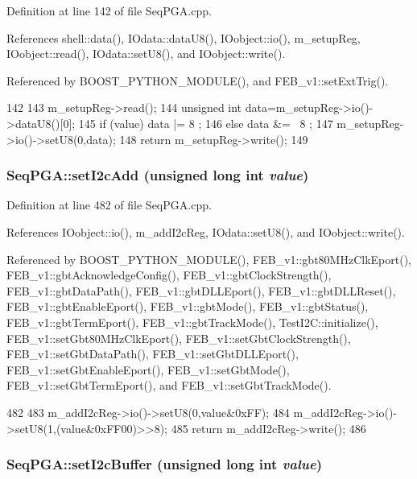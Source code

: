 Definition at line 142 of file SeqPGA.cpp.

References shell::data(), IOdata::dataU8(), IOobject::io(), m\_\-setupReg, IOobject::read(), IOdata::setU8(), and IOobject::write().

Referenced by BOOST\_\-PYTHON\_\-MODULE(), and FEB\_\-v1::setExtTrig().


\begin{DoxyCode}
142                                          {
143   m_setupReg->read();
144   unsigned int data=m_setupReg->io()->dataU8()[0];
145   if (value) data |=  8 ;
146   else       data &= ~8 ;
147   m_setupReg->io()->setU8(0,data);
148   return m_setupReg->write();
149 }
\end{DoxyCode}
\hypertarget{classSeqPGA_a4ef334e4d2cb417b49033dce951728cd}{
\subsubsection[{setI2cAdd}]{ SeqPGA::setI2cAdd (unsigned long int {\em value})}}
\label{classSeqPGA_a4ef334e4d2cb417b49033dce951728cd}


Definition at line 482 of file SeqPGA.cpp.

References IOobject::io(), m\_\-addI2cReg, IOdata::setU8(), and IOobject::write().

Referenced by BOOST\_\-PYTHON\_\-MODULE(), FEB\_\-v1::gbt80MHzClkEport(), FEB\_\-v1::gbtAcknowledgeConfig(), FEB\_\-v1::gbtClockStrength(), FEB\_\-v1::gbtDataPath(), FEB\_\-v1::gbtDLLEport(), FEB\_\-v1::gbtDLLReset(), FEB\_\-v1::gbtEnableEport(), FEB\_\-v1::gbtMode(), FEB\_\-v1::gbtStatus(), FEB\_\-v1::gbtTermEport(), FEB\_\-v1::gbtTrackMode(), TestI2C::initialize(), FEB\_\-v1::setGbt80MHzClkEport(), FEB\_\-v1::setGbtClockStrength(), FEB\_\-v1::setGbtDataPath(), FEB\_\-v1::setGbtDLLEport(), FEB\_\-v1::setGbtEnableEport(), FEB\_\-v1::setGbtMode(), FEB\_\-v1::setGbtTermEport(), and FEB\_\-v1::setGbtTrackMode().


\begin{DoxyCode}
482                                                      {
483   m_addI2cReg->io()->setU8(0,value&0xFF);
484   m_addI2cReg->io()->setU8(1,(value&0xFF00)>>8);
485   return m_addI2cReg->write();
486 }
\end{DoxyCode}
\hypertarget{classSeqPGA_ab93beca49a31c1f9fddc915e9efeeaa0}{
\subsubsection[{setI2cBuffer}]{ SeqPGA::setI2cBuffer (unsigned long int {\em value})}}
\label{classSeqPGA_ab93beca49a31c1f9fddc915e9efeeaa0}


